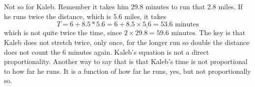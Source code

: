 Not so for Kaleb. Remember it takes him 29.8 minutes to run that 2.8 miles.   If he runs twice the distance, which is 5.6 miles, it takes 
$$T = 6+8.5 \ast 5.6 = 6+ 8.5 \times \underline{5.6} = 53.6 \text{ minutes}$$
which is not quite twice the time, since $2 \times 29.8 = 59.6 \text{ minutes}$.
The key is that Kaleb does not stretch twice, only once, for the longer run so double the distance does not count the 6 minutes again.  Kaleb's equation is not a direct proportionality.  Another way to say that is that Kaleb's time is not proportional to how far he runs.  It is a function of how far he runs, yes, but not proportionally so.

 
